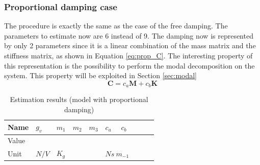 \documentclass[twosided,a4paper]{article}           %
\begin{document}
\subsubsection{Proportional damping case}
\label{sec:prop_est}
The procedure is exactly the same as the case of the free damping. The parameters to estimate now are 6 instead of 9. The damping now is represented by only 2 parameters since it is a linear combination of the mass matrix and the stiffness matrix, as shown in Equation \eqref{eq:prop_C}. The interesting property of this representation is the possibility to perform the modal decomposition on the system. This property will be exploited in Section \ref{sec:modal}
\begin{equation}
\label{eq:prop_C}
\bm{C} = c_a\bm{M} + c_b\bm{K}
\end{equation}
\begin{table}[H]
	\centering
	\begin{tabular}{|l|l|l|l|l|l|l|l|l|l|}
		\hline
		Name & $g_v$ &  $m_1$ & $m_2$ & $m_3$  &  $c_a$ & $c_b$  \\
		\hline
		Value &  &  &  &  &  &  \\ 
		\hline
		Unit & $N/V$ &  \multicolumn{3}{l|}{$K_g$}  &  \multicolumn{2}{l|}{$Ns \ m_{-1}$} \\
		\hline
	\end{tabular}
	\caption{Estimation results (model with proportional damping)}
	\label{tab:est_prop_results}
\end{table}
\newpage
\end{document}
